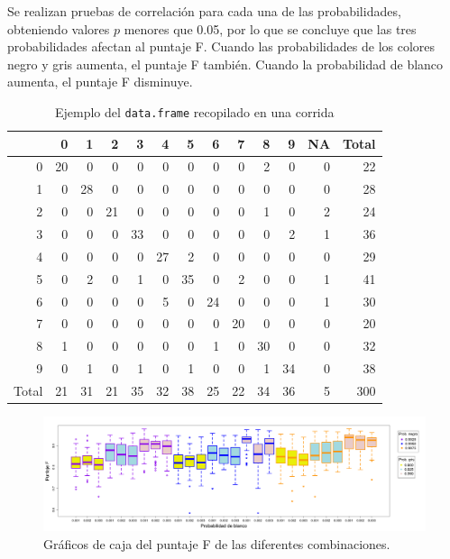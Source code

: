 \documentclass[12pt,letterpaper]{article}
\begin{document}
Se realizan pruebas de correlación para cada una de las probabilidades, obteniendo valores $p$ menores que 0.05, por lo que se concluye que las tres probabilidades afectan al puntaje F. Cuando las probabilidades de los colores negro y gris aumenta, el puntaje F también. Cuando la probabilidad de blanco aumenta, el puntaje F disminuye.
\begin{table}
\centering
\caption{Ejemplo del \texttt{data.frame} recopilado en una corrida }
\begin{tabular}{rrrrrrrrrrrrr}
  \hline
 & 0 & 1 & 2 & 3 & 4 & 5 & 6 & 7 & 8 & 9 & NA & Total \\ 
  \hline
0 & 20 & 0 & 0 & 0 & 0 & 0 & 0 & 0 & 2 & 0 & 0 & 22 \\ 
  1 & 0 & 28 & 0 & 0 & 0 & 0 & 0 & 0 & 0 & 0 & 0 & 28 \\ 
  2 & 0 & 0 & 21 & 0 & 0 & 0 & 0 & 0 & 1 & 0 & 2 & 24 \\ 
  3 & 0 & 0 & 0 & 33 & 0 & 0 & 0 & 0 & 0 & 2 & 1 & 36 \\ 
  4 & 0 & 0 & 0 & 0 & 27 & 2 & 0 & 0 & 0 & 0 & 0 & 29 \\ 
  5 & 0 & 2 & 0 & 1 & 0 & 35 & 0 & 2 & 0 & 0 & 1 & 41 \\ 
  6 & 0 & 0 & 0 & 0 & 5 & 0 & 24 & 0 & 0 & 0 & 1 & 30 \\ 
  7 & 0 & 0 & 0 & 0 & 0 & 0 & 0 & 20 & 0 & 0 & 0 & 20 \\ 
  8 & 1 & 0 & 0 & 0 & 0 & 0 & 1 & 0 & 30 & 0 & 0 & 32 \\ 
  9 & 0 & 1 & 0 & 1 & 0 & 1 & 0 & 0 & 1 & 34 & 0 & 38 \\ 
  Total & 21 & 31 & 21 & 35 & 32 & 38 & 25 & 22 & 34 & 36 & 5 & 300 \\ 
   \hline
\end{tabular}
\label{dataframe}
\end{table}

 \begin{figure}
 	\centering 
		\includegraphics[width=\linewidth]{boxplot.png} 		
		\caption{Gráficos de caja del puntaje F de las diferentes combinaciones.}
		 		\label{im}
 	\end{figure}  
\end{document}
